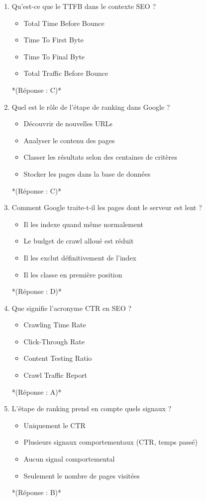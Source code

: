 \documentclass[12pt,a4paper,twoside]{report}
\begin{document}
\begin{enumerate}
\item Qu'est-ce que le TTFB dans le contexte SEO ?
\begin{itemize}
\item[A)] Total Time Before Bounce
\item[B)] Time To First Byte
\item[C)] Time To Final Byte
\item[D)] Total Traffic Before Bounce
\end{itemize}
*(Réponse : C)*

\item Quel est le rôle de l'étape de ranking dans Google ?
\begin{itemize}
\item[A)] Découvrir de nouvelles URLs
\item[B)] Analyser le contenu des pages
\item[C)] Classer les résultats selon des centaines de critères
\item[D)] Stocker les pages dans la base de données
\end{itemize}
*(Réponse : C)*

\item Comment Google traite-t-il les pages dont le serveur est lent ?
\begin{itemize}
\item[A)] Il les indexe quand même normalement
\item[B)] Le budget de crawl alloué est réduit
\item[C)] Il les exclut définitivement de l'index
\item[D)] Il les classe en première position
\end{itemize}
*(Réponse : D)*

\item Que signifie l'acronyme CTR en SEO ?
\begin{itemize}
\item[A)] Crawling Time Rate
\item[B)] Click-Through Rate
\item[C)] Content Testing Ratio
\item[D)] Crawl Traffic Report
\end{itemize}
*(Réponse : A)*

\item L'étape de ranking prend en compte quels signaux ?
\begin{itemize}
\item[A)] Uniquement le CTR
\item[B)] Plusieurs signaux comportementaux (CTR, temps passé)
\item[C)] Aucun signal comportemental
\item[D)] Seulement le nombre de pages visitées
\end{itemize}
*(Réponse : B)*


\end{enumerate}
\end{document}

